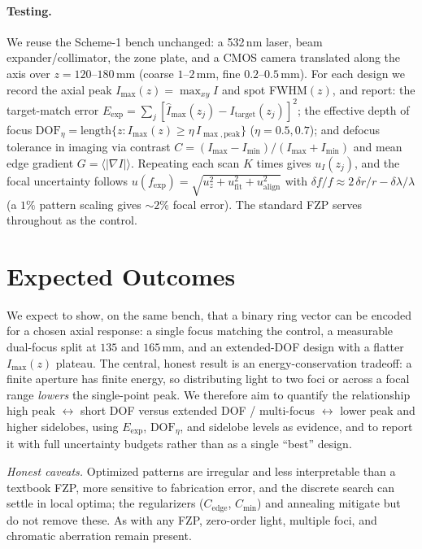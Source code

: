 \documentclass[11pt,a4paper]{article}
\begin{document}
\paragraph{Testing.} We reuse the Scheme-1 bench unchanged: a 532\,nm laser, beam expander/collimator, the zone plate, and a CMOS camera translated along the axis over $z=120$--$180$\,mm (coarse $1$--$2$\,mm, fine $0.2$--$0.5$\,mm). For each design we record the axial peak $I_{\max}(z)=\max_{xy}I$ and spot FWHM$(z)$, and report: the target-match error $E_{\text{exp}}=\sum_j[\hat I_{\max}(z_j)-I_{\text{target}}(z_j)]^2$; the effective depth of focus $\mathrm{DOF}_\eta=\text{length}\{z:I_{\max}(z)\ge\eta\,I_{\max,\text{peak}}\}$ ($\eta=0.5,0.7$); and defocus tolerance in imaging via contrast $C=(I_{\max}-I_{\min})/(I_{\max}+I_{\min})$ and mean edge gradient $G=\langle|\nabla I|\rangle$. Repeating each scan $K$ times gives $u_I(z_j)$, and the focal uncertainty follows $u(f_{\text{exp}})=\sqrt{u_z^2+u_{\text{fit}}^2+u_{\text{align}}^2}$ with $\delta f/f\approx 2\,\delta r/r-\delta\lambda/\lambda$ (a $1\%$ pattern scaling gives $\sim2\%$ focal error). The standard FZP serves throughout as the control.

\section{Expected Outcomes}

We expect to show, on the same bench, that a binary ring vector can be encoded for a chosen axial response: a single focus matching the control, a measurable dual-focus split at $135$ and $165$\,mm, and an extended-DOF design with a flatter $I_{\max}(z)$ plateau. The central, honest result is an energy-conservation tradeoff: a finite aperture has finite energy, so distributing light to two foci or across a focal range \emph{lowers} the single-point peak. We therefore aim to quantify the relationship high peak $\leftrightarrow$ short DOF versus extended DOF / multi-focus $\leftrightarrow$ lower peak and higher sidelobes, using $E_{\text{exp}}$, $\mathrm{DOF}_\eta$, and sidelobe levels as evidence, and to report it with full uncertainty budgets rather than as a single ``best'' design.

\emph{Honest caveats.} Optimized patterns are irregular and less interpretable than a textbook FZP, more sensitive to fabrication error, and the discrete search can settle in local optima; the regularizers ($C_{\text{edge}}$, $C_{\min}$) and annealing mitigate but do not remove these. As with any FZP, zero-order light, multiple foci, and chromatic aberration remain present.
\end{document}
